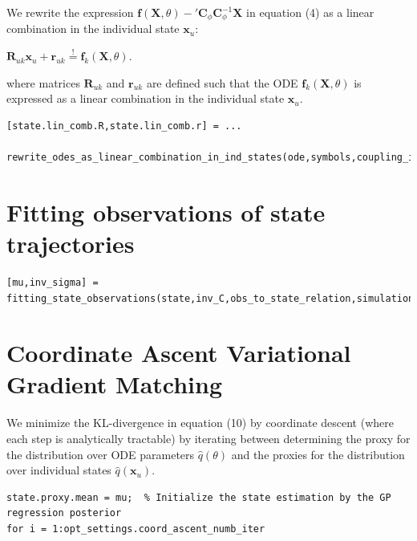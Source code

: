 \begin{par}
We rewrite the expression $\mathbf{f}(\mathbf{X},\theta) - {'\mathbf{C}}_{\phi} \mathbf{C}_{\phi}^{-1} \mathbf{X}$ in equation (4) as a linear combination in the individual state $\mathbf{x}_u$:
\end{par} \vspace{1em}
\begin{par}
$\mathbf{R}_{uk} \mathbf{x}_u + \mathbf{r}_{uk} \stackrel{!}{=} \mathbf{f}_k(\mathbf{X},\theta)$.
\end{par} \vspace{1em}
\begin{par}
where matrices $\mathbf{R}_{uk}$ and $\mathbf{r}_{uk}$ are defined such that the ODE $\mathbf{f}_k(\mathbf{X},\theta)$ is expressed as a linear combination in the individual state $\mathbf{x}_u$.
\end{par} \vspace{1em}
\color{RoyalPurple}\begin{verbatim}
[state.lin_comb.R,state.lin_comb.r] = ...
    rewrite_odes_as_linear_combination_in_ind_states(ode,symbols,coupling_idx.states);
\end{verbatim}
\color{black}



\section{Fitting observations of state trajectories}

\color{RoyalPurple}\begin{verbatim}
[mu,inv_sigma] = fitting_state_observations(state,inv_C,obs_to_state_relation,simulation);
\end{verbatim}
\color{black}


\section{Coordinate Ascent Variational Gradient Matching}

\begin{par}
We minimize the KL-divergence in equation (10) by coordinate descent (where each step is analytically tractable) by iterating between determining the proxy for the distribution over ODE parameters $\hat{q}(\theta)$ and the proxies for the distribution over individual states $\hat{q}(\mathbf{x}_u)$.
\end{par} \vspace{1em}
\color{RoyalPurple}\begin{verbatim}
state.proxy.mean = mu;  % Initialize the state estimation by the GP regression posterior
for i = 1:opt_settings.coord_ascent_numb_iter
\end{verbatim}
\color{black}

